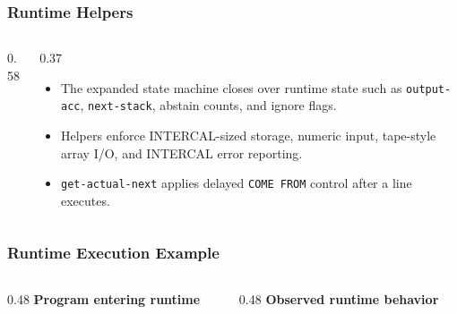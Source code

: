 \documentclass{beamer}
\begin{document}
\begin{frame}[fragile,shrink=8]
  \frametitle{Runtime Helpers}

  \begin{columns}[T]
    \begin{column}{0.58\textwidth}
      
    \end{column}
    \begin{column}{0.37\textwidth}
      \begin{itemize}
        \item The expanded state machine closes over runtime state such as \texttt{output-acc}, \texttt{next-stack}, abstain counts, and ignore flags.
        \item Helpers enforce INTERCAL-sized storage, numeric input, tape-style array I/O, and INTERCAL error reporting.
        \item \texttt{get-actual-next} applies delayed \texttt{COME FROM} control after a line executes.
      \end{itemize}
    \end{column}
  \end{columns}
\end{frame}

\begin{frame}[fragile,shrink=8]
  \frametitle{Runtime Execution Example}

  \begin{columns}[T]
    \begin{column}{0.48\textwidth}
      \textbf{Program entering runtime}
      
    \end{column}
    \begin{column}{0.48\textwidth}
      \textbf{Observed runtime behavior}
      
    \end{column}
  \end{columns}
\end{frame}
\end{document}
